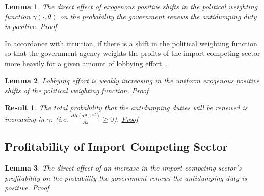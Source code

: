 \documentclass[10pt]{article}
\newtheorem{lemma}{Lemma}
\newtheorem{corollary}{Corollary}
\newtheorem{result}{Result}
\newcommand{\ta}{\theta}
\newcommand{\bta}{\bm{\tau^a}}
\newcommand{\tad}{\tau^{ad}}
\newcommand{\ga}{\gamma}
\begin{document}
\begin{lemma}
  The direct effect of exogenous positive shifts in the political weighting function $\ga(\cdot,\ta)$ on the probability the government renews the antidumping duty is positive. \hyperlink{Pr_ga_dir}{Proof}
	  \label{res:ga_dir}
\end{lemma}

In accordance with intuition, if there is a shift in the political weighting function so that the government agency weights the profits of the import-competing sector more heavily for a given amount of lobbying effort....


\begin{lemma}
  Lobbying effort is weakly increasing in the uniform exogenous positive shifts of the political weighting function. \hyperlink{Pr_ga_indir}{Proof}
  \label{res:ga_indir}
\end{lemma}


\begin{result}
	The total probability that the antidumping duties will be renewed is increasing in $\ga$. (i.e. $\frac{\partial R(\bta,\tad)}{\partial  \pi} \geq 0$). \hyperlink{Pr_ga_total}{Proof}
	\label{res:ga_total}
\end{result}






\subsection{Profitability of Import Competing Sector}
\label{sec:pi}


\begin{lemma}
  The direct effect of an increase in the import competing sector's profitability on the probability the government renews the antidumping duty is positive. \hyperlink{Pr_pi_dir}{Proof}
  \label{res:pi_dir}
\end{lemma}
\end{document}
